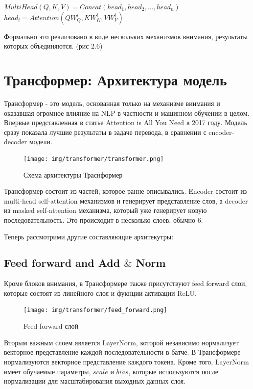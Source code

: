 \documentclass[PMI,VKR]{HSEUniversity}
\begin{document}
\begin{center}
    $MultiHead(Q, K, V) = Concat(head_{1}, head_{2}, \dots, head_{n})$ \\
    $head_{i} = Attention(QW^{i}_{Q}, KW^{i}_{K}, VW^{i}_{V})$
\end{center}

Формально это реализовано в виде нескольких механизмов внимания, результаты которых объединяются. (рис 2.6)

\newpage
\section{Трансформер: Архитектура модель}

Трансформер - это модель, основанная только на механизме винмания и оказавшая огромное влияние на NLP в частности и машинном обучении в целом. Впервые представленная в статье Attention is All You Need\cite{allyouneed:2017} в 2017 году.
Модель сразу показала лучшие результаты в задаче перевода, в сравнении с encoder-decoder модели.

\begin{figure}[h]
    \centering
    \texttt{[image: img/transformer/transformer.png]}
    \caption{Схема архитектуры Траснформер}
\end{figure}

Трансформер состоит из частей, которое ранне описывались. Encoder состоит из multi-head self-attention механизмов и генерирует представление слов, а decoder из masked self-attention механизма, который уже генерирует новую последовательность. Это происходит в несколько слоев, обычно 6.

Теперь рассмотрими другие составляющие архитекутры:\\


\subsection{Feed forward and Add $\&$ Norm}

Кроме блоков внимания, в Трансформере также присутствуют feed forward слои, которые состоят из линейного слоя и фукнции активации ReLU.

\begin{figure}[h]
    \centering
    \texttt{[image: img/transformer/feed\_forward.png]}
    \caption{Feed-forward слой}
\end{figure}

Вторым важным слоем является LayerNorm, которой независимо нормализует векторное представление каждой последовательности в батче. В Трансформере нормализуются векторное представление каждого токена. Кроме того, LayerNorm имеет обучаемые параметры, $scale$ и $bias$, которые используются после нормализации для масштабирования выходных данных слоя.
\end{document}
